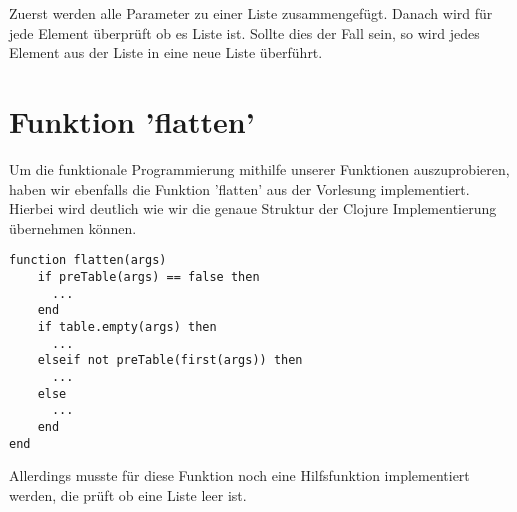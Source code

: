 Zuerst werden alle Parameter zu einer Liste zusammengefügt. Danach wird für jede Element überprüft ob es Liste ist. Sollte dies der Fall sein, so wird jedes Element aus der Liste in eine neue Liste überführt.

\section{Funktion 'flatten'}{
Um die funktionale Programmierung mithilfe unserer Funktionen auszuprobieren, haben wir ebenfalls die Funktion 'flatten' aus der Vorlesung implementiert. Hierbei wird deutlich wie wir die genaue Struktur der Clojure Implementierung übernehmen können.

\begin{lstlisting}
function flatten(args)
    if preTable(args) == false then
      ...
    end
    if table.empty(args) then
      ...
    elseif not preTable(first(args)) then
      ...
    else
      ...
    end
end
\end{lstlisting} 

Allerdings musste für diese Funktion noch eine Hilfsfunktion implementiert werden, die prüft ob eine Liste leer ist.
}


